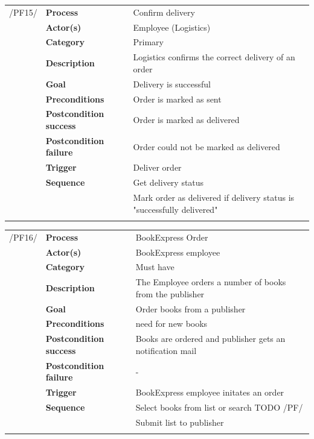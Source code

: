 \documentclass[11pt,a4paper,oneside,svgnames]{report}
\begin{document}
\noindent
\begin{tabular}{p{1.5cm}p{3cm}p{8cm}}
\cellcolor{white}/PF15/	& \textbf{Process} & Confirm delivery\\
\cellcolor{white}		& \textbf{Actor(s)} & Employee (Logistics)\\
\cellcolor{white}		& \textbf{Category} & Primary\\
\cellcolor{white}		& \textbf{Description}	 & Logistics confirms the correct delivery of an order\\
\cellcolor{white}		& \textbf{Goal} & Delivery is successful\\
\cellcolor{white}		& \textbf{Preconditions} & Order is marked as sent\\
\cellcolor{white}		& \textbf{Postcondition success} & Order is marked as delivered\\
\cellcolor{white}		& \textbf{Postcondition failure} & Order could not be marked as delivered\\
\cellcolor{white}		& \textbf{Trigger} & Deliver order\\
\cellcolor{white}		& \textbf{Sequence} & Get delivery status\\
\cellcolor{white}		& & Mark order as delivered if delivery status is "successfully delivered"\\
\cellcolor{white}\hfill \\
\end{tabular}

\noindent
\begin{tabular}{p{1.5cm}p{3cm}p{8cm}}
\cellcolor{white}/PF16/	& \textbf{Process} & BookExpress Order\\
\cellcolor{white}		& \textbf{Actor(s)} & BookExpress employee\\
\cellcolor{white}		& \textbf{Category} & Must have\\
\cellcolor{white}		& \textbf{Description}	 & The Employee orders a number of books from the publisher\\
\cellcolor{white}		& \textbf{Goal} & Order books from a publisher\\
\cellcolor{white}		& \textbf{Preconditions} & need for new books\\
\cellcolor{white}		& \textbf{Postcondition success} & Books are ordered and publisher gets an notification mail\\
\cellcolor{white}		& \textbf{Postcondition failure} & -\\
\cellcolor{white}		& \textbf{Trigger} & BookExpress employee initates an order\\
\cellcolor{white}		& \textbf{Sequence} & Select books from list or search TODO /PF/\\
\cellcolor{white}		& & Submit list to publisher\\
\cellcolor{white}\hfill \\
\end{tabular}
\end{document}
